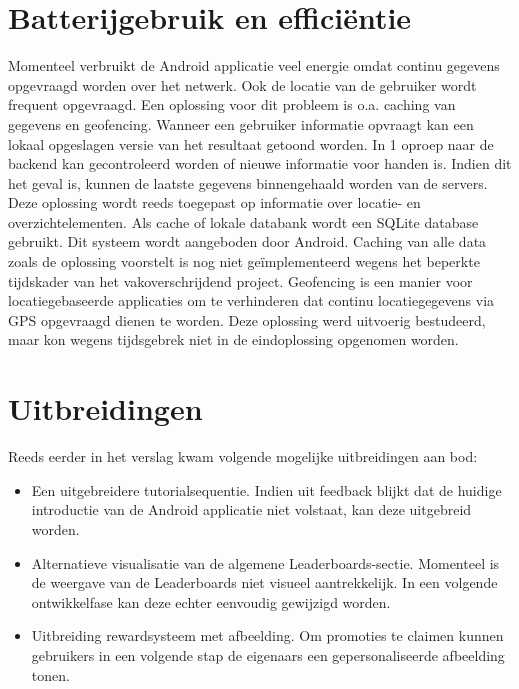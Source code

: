 \section{Batterijgebruik en efficiëntie}
Momenteel verbruikt de Android applicatie veel energie omdat continu gegevens opgevraagd worden over het netwerk. Ook de locatie van de gebruiker wordt frequent opgevraagd.
Een oplossing voor dit probleem is o.a. caching van gegevens en geofencing. Wanneer een gebruiker informatie opvraagt kan een lokaal opgeslagen versie van het resultaat getoond worden. In 1 oproep naar de backend kan gecontroleerd worden of nieuwe informatie voor handen is. Indien dit het geval is, kunnen de laatste gegevens binnengehaald worden van de servers. Deze oplossing wordt reeds toegepast op informatie over locatie- en overzichtelementen. Als cache of lokale databank wordt een SQLite database gebruikt. Dit systeem wordt aangeboden door Android. Caching van alle data zoals de oplossing voorstelt is nog niet geïmplementeerd wegens het beperkte tijdskader van het vakoverschrijdend project.
Geofencing is een manier voor locatiegebaseerde applicaties om te verhinderen dat continu locatiegegevens via GPS opgevraagd dienen te worden. Deze oplossing werd uitvoerig bestudeerd, maar kon wegens tijdsgebrek niet in de eindoplossing opgenomen worden.
\section{Uitbreidingen}
Reeds eerder in het verslag kwam volgende mogelijke uitbreidingen aan bod:
\begin{itemize}
	\item Een uitgebreidere tutorialsequentie. Indien uit feedback blijkt dat de huidige introductie van de Android applicatie niet volstaat, kan deze uitgebreid worden.
	\item Alternatieve visualisatie van de algemene Leaderboards-sectie. Momenteel is de weergave van de Leaderboards niet visueel aantrekkelijk. In een volgende ontwikkelfase kan deze echter eenvoudig gewijzigd worden.
	\item Uitbreiding rewardsysteem met afbeelding. Om promoties te claimen kunnen gebruikers in een volgende stap de eigenaars een gepersonaliseerde afbeelding tonen.
\end{itemize}



